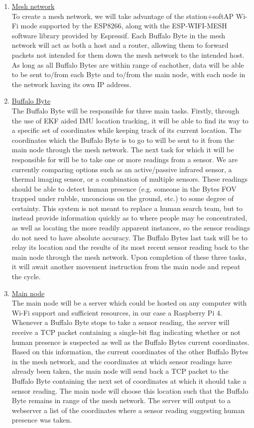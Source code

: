 \documentclass[10pt]{article}
\begin{document}
\begin{enumerate}
	\item\underline{Mesh network}\\
	To create a mesh network, we will take advantage of the station+softAP Wi-Fi mode supported by the ESP8266, along with the ESP-WIFI-MESH software library provided by Espressif. Each Buffalo Byte in the mesh network will act as both a host and a router, allowing them to forward packets not intended for them down the mesh network to the intended host. As long as all Buffalo Bytes are within range of eachother, data will be able to be sent to/from each Byte and to/from the main node, with each node in the network having its own IP address.

	\item\underline{Buffalo Byte}\\
	The Buffalo Byte will be responsible for three main tasks. Firstly, through the use of EKF aided IMU location tracking, it will be able to find its way to a specific set of coordinates while keeping track of its current location. The coordinates which the Buffalo Byte is to go to will be sent to it from the main node through the mesh network. The next task for which it will be responsible for will be to take one or more readings from a sensor. We are currently comparing options such as an active/passive infrared sensor, a thermal imaging sensor, or a combination of multiple sensors. These readings should be able to detect human presence (e.g. someone in the Bytes FOV trapped under rubble, unconcious on the ground, etc.) to some degree of certainty. This system is not meant to replace a human search team, but to instead provide information quickly as to where people may be concentrated, as well as locating the more readily apparent instances, so the sensor readings do not need to have absolute accuracy. The Buffalo Bytes last task will be to relay its location and the results of its most recent sensor reading back to the main node through the mesh network. Upon completion of these three tasks, it will await another movement instruction from the main node and repeat the cycle.

	\item\underline{Main node}\\
	The main node will be a server which could be hosted on any computer with Wi-Fi support and sufficient resources, in our case a Raspberry Pi 4. Whenever a Buffalo Byte stops to take a sensor reading, the server will receive a TCP packet containing a single-bit flag indicating whether or not human presence is suspected as well as the Buffalo Bytes current coordinates. Based on this information, the current coordinates of the other Buffalo Bytes in the mesh network, and the coordinates at which sensor readings have already been taken, the main node will send back a TCP packet to the Buffalo Byte containing the next set of coordinates at which it should take a sensor reading. The main node will choose this location such that the Buffalo Byte remains in range of the mesh network. The server will output to a webserver a list of the coordinates where a sensor reading suggesting human presence was taken.
\end{enumerate}
\end{document}
